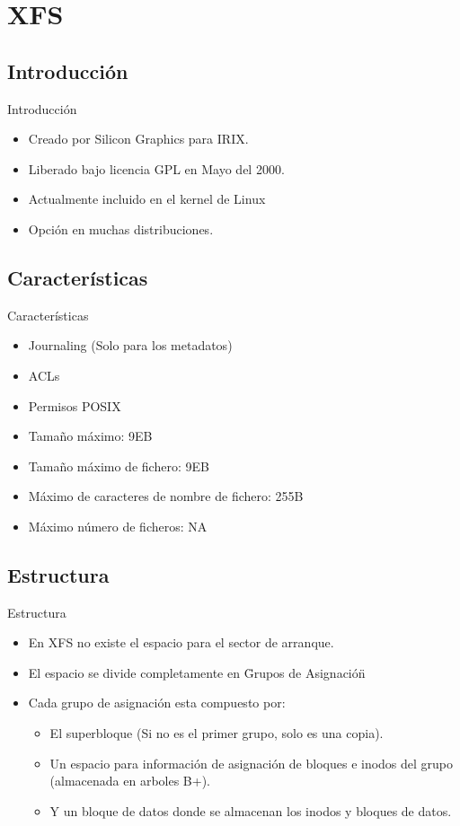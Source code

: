 \section{XFS}
\subsection{Introducción}
\begin{frame}{Introducción}
  \begin{itemize}
    \item Creado por Silicon Graphics para IRIX.
    \item Liberado bajo licencia GPL en Mayo del 2000.
    \item Actualmente incluido en el kernel de Linux
    \item Opción en muchas distribuciones.
  \end{itemize}
\end{frame}

\subsection{Características}
\begin{frame}{Características}
  \begin{itemize}
    \item Journaling (Solo para los metadatos)
    \item ACLs
    \item Permisos POSIX
    \item Tamaño máximo: 9EB
    \item Tamaño máximo de fichero: 9EB
    \item Máximo de caracteres de nombre de fichero: 255B
    \item Máximo número de ficheros: NA
  \end{itemize}
\end{frame}

\subsection{Estructura}
\begin{frame}{Estructura}
  \begin{itemize}
    \item En XFS no existe el espacio para el sector de arranque.
    \item El espacio se divide completamente en \"Grupos de Asignación\"
    \item Cada grupo de asignación esta compuesto por:
    \begin{itemize}
      \item El superbloque (Si no es el primer grupo, solo es una copia).
      \item Un espacio para información de asignación de bloques e inodos del grupo (almacenada en arboles B+).
      \item Y un bloque de datos donde se almacenan los inodos y bloques de datos.
    \end{itemize}
  \end{itemize}
\end{frame}

